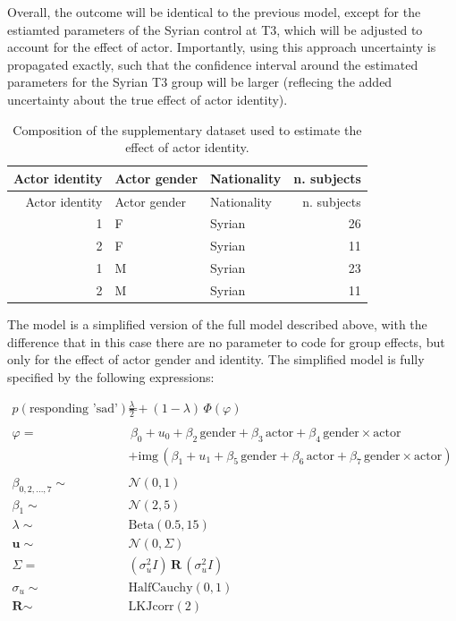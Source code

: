 \documentclass[]{article}
\begin{document}
Overall, the outcome will be identical to the previous model, except for
the estiamted parameters of the Syrian control at T3, which will be
adjusted to account for the effect of actor. Importantly, using this
approach uncertainty is propagated exactly, such that the confidence
interval around the estimated parameters for the Syrian T3 group will be
larger (reflecing the added uncertainty about the true effect of actor
identity).

\begin{longtable}[]{@{}rllr@{}}
\caption{Composition of the supplementary dataset used to estimate the
effect of actor identity.}\tabularnewline
\toprule
Actor identity & Actor gender & Nationality & n. subjects\tabularnewline
\midrule
\endfirsthead
\toprule
Actor identity & Actor gender & Nationality & n. subjects\tabularnewline
\midrule
\endhead
1 & F & Syrian & 26\tabularnewline
2 & F & Syrian & 11\tabularnewline
1 & M & Syrian & 23\tabularnewline
2 & M & Syrian & 11\tabularnewline
\bottomrule
\end{longtable}

The model is a simplified version of the full model described above,
with the difference that in this case there are no parameter to code for
group effects, but only for the effect of actor gender and identity. The
simplified model is fully specified by the following expressions:

\begin{align*}
 p(\text{responding 'sad'}) = & \frac{\lambda}{2} + (1 - \lambda) \, \Phi \left(\varphi \right)  \\
 \, \\
\varphi =  & \,  \beta_0  + u_0 + \beta_2 \, \text{gender} +\beta_3\, \text{actor} + \beta_4 \, \text{gender} \times \text{actor} \\
 & +  \text{img} \, \left(\beta_1 +  u_1 + \beta_5 \, \text{gender} +\beta_6\, \text{actor} + \beta_7 \, \text{gender} \times \text{actor} \right) \\
\, \\
\beta_{0, 2, \dots, 7} \sim & \mathcal{N}\left(0, 1 \right) \\
\beta_1 \sim & \mathcal{N}\left(2, 5 \right) \\
\lambda \sim & \text{Beta} \left(0.5, 15 \right)\\
\mathbf{u} \sim & \mathcal{N}\left(0, \Sigma \right) \\
\Sigma  = & \left(\sigma_u^2 \textit{I} \right) \, \textbf{R} \, \left( \sigma_u^2 \textit{I} \right) \\
\sigma_u  \sim & \text{HalfCauchy} \left(0, 1\right)\\
\textbf{R} \sim & \text{LKJcorr} \left( 2 \right)
\end{align*}
\end{document}
